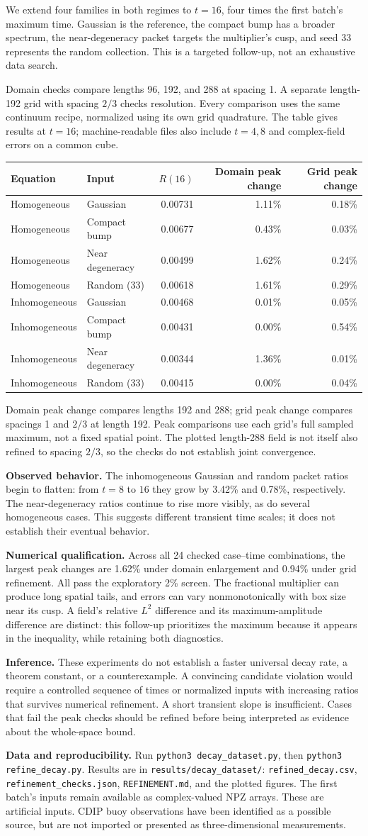 \documentclass[10pt,letterpaper]{article}
\numberwithin{equation}{section}
\newcommand{\RefinedRows}{Homogeneous & Gaussian & 0.00731 & 1.11\% & 0.18\% \\
Homogeneous & Compact bump & 0.00677 & 0.43\% & 0.03\% \\
Homogeneous & Near degeneracy & 0.00499 & 1.62\% & 0.24\% \\
Homogeneous & Random (33) & 0.00618 & 1.61\% & 0.29\% \\
Inhomogeneous & Gaussian & 0.00468 & 0.01\% & 0.05\% \\
Inhomogeneous & Compact bump & 0.00431 & 0.00\% & 0.54\% \\
Inhomogeneous & Near degeneracy & 0.00344 & 1.36\% & 0.01\% \\
Inhomogeneous & Random (33) & 0.00415 & 0.00\% & 0.04\% \\}
\newcommand{\ObservedResult}{The inhomogeneous Gaussian and random packet ratios begin to flatten: from $t=8$ to $16$ they grow by 3.42\% and 0.78\%, respectively. The near-degeneracy ratios continue to rise more visibly, as do several homogeneous cases. This suggests different transient time scales; it does not establish their eventual behavior.}
\newcommand{\CheckResult}{Across all 24 checked case--time combinations, the largest peak changes are 1.62\% under domain enlargement and 0.94\% under grid refinement. All pass the exploratory 2\% screen.}
\begin{document}
We extend four families in both regimes to $t=16$, four times the first batch's
maximum time. Gaussian is the reference, the compact bump has a broader spectrum,
the near-degeneracy packet targets the multiplier's cusp, and seed 33 represents
the random collection. This is a targeted follow-up, not an exhaustive data search.

Domain checks compare lengths 96, 192, and 288 at spacing 1. A separate length-192
grid with spacing $2/3$ checks resolution. Every comparison uses the same continuum
recipe, normalized using its own grid quadrature. The table gives results at $t=16$;
machine-readable files also include $t=4,8$ and complex-field errors on a common cube.

\begin{center}\small
\begin{tabular}{llrrr}\toprule
Equation & Input & $R(16)$ & Domain peak change & Grid peak change\\\midrule
\RefinedRows
\bottomrule\end{tabular}
\end{center}
Domain peak change compares lengths 192 and 288; grid peak change compares
spacings 1 and $2/3$ at length 192. Peak comparisons use each grid's full sampled
maximum, not a fixed spatial point. The plotted length-288 field is not itself
also refined to spacing $2/3$, so the checks do not establish joint convergence.

\textbf{Observed behavior.} \ObservedResult

\textbf{Numerical qualification.} \CheckResult
The fractional multiplier can produce long spatial tails, and errors can vary
nonmonotonically with box size near its cusp. A field's relative $L^2$ difference
and its maximum-amplitude difference are distinct: this follow-up prioritizes the
maximum because it appears in the inequality, while retaining both diagnostics.

\textbf{Inference.} These experiments do not establish a faster universal decay
rate, a theorem constant, or a counterexample. A convincing candidate violation
would require a controlled sequence of times or normalized inputs with increasing
ratios that survives numerical refinement. A short transient slope is insufficient.
Cases that fail the peak checks should be refined before being interpreted as
evidence about the whole-space bound.

\textbf{Data and reproducibility.} Run \texttt{python3 decay\_dataset.py}, then
\texttt{python3 refine\_decay.py}. Results are in
\texttt{results/decay\_dataset/}: \texttt{refined\_decay.csv},
\texttt{refinement\_checks.json}, \texttt{REFINEMENT.md}, and the plotted figures.
The first batch's inputs remain available as complex-valued NPZ arrays.
These are artificial inputs. CDIP buoy observations have been identified as a
possible source, but are not imported or presented as three-dimensional measurements.
\end{document}
